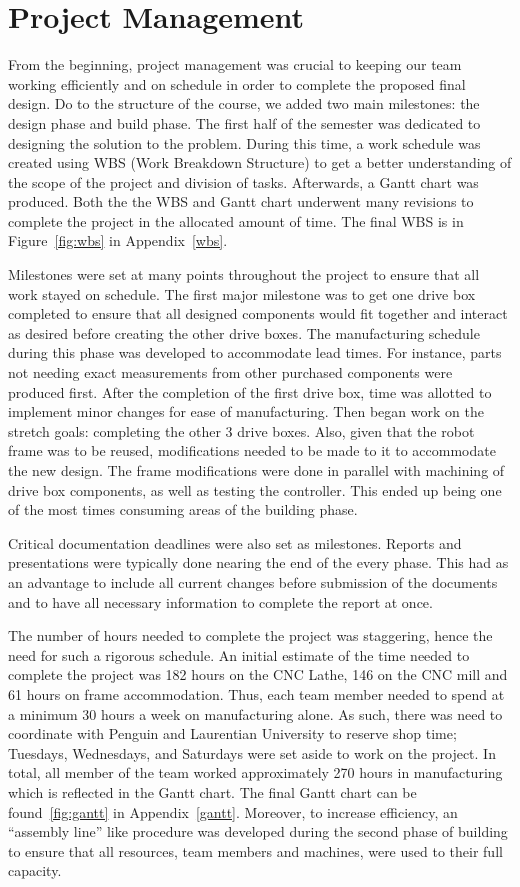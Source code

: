\section{Project Management}

From the beginning, project management was crucial to keeping our team working efficiently and on schedule in order to complete the proposed final design. Do to the structure of the course, we added two main milestones: the design phase and build phase. The first half of the semester was dedicated to designing the solution to the problem. During this time, a work schedule was created using WBS (Work Breakdown Structure) to get a better understanding of the scope of the project and division of tasks. Afterwards, a Gantt chart was produced. Both the the WBS and Gantt chart underwent many revisions to complete the project in the allocated amount of time. The final WBS is in Figure~\ref{fig:wbs} in Appendix~\ref{wbs}.

Milestones were set at many points throughout the project to ensure that all work stayed on schedule. The first major milestone was to get one drive box completed to ensure that all designed components would fit together and interact as desired before creating the other drive boxes. The manufacturing schedule during this phase was developed to accommodate lead times. For instance, parts not needing exact measurements from other purchased components were produced first. After the completion of the first drive box, time was allotted to implement minor changes for ease of manufacturing. Then began work on the stretch goals: completing the other 3 drive boxes. Also, given that the robot frame was to be reused, modifications needed to be made to it to accommodate the new design. The frame modifications were done in parallel with machining of drive box components, as well as testing the controller.  This ended up being one of the most times consuming areas of the building phase.

Critical documentation deadlines were also set as milestones. Reports and presentations were typically done nearing the end of the every phase. This had as an advantage to include all current changes before submission of the documents and to have all necessary information to complete the report at once. 

The number of hours needed to complete the project was staggering, hence the need for such a rigorous schedule. An initial estimate of the time needed to complete the project was 182 hours on the CNC Lathe, 146 on the CNC mill and 61 hours on frame accommodation. Thus, each team member needed to spend at a minimum 30 hours a week on manufacturing alone. As such, there was need to coordinate with Penguin and Laurentian University to reserve shop time; Tuesdays, Wednesdays, and Saturdays were set aside to work on the project. In total, all member of the team worked approximately 270 hours in manufacturing which is reflected in the Gantt chart. The final Gantt chart can be found~\ref{fig:gantt} in Appendix~\ref{gantt}. Moreover, to increase efficiency, an ``assembly line'' like procedure was developed during the second phase of building to ensure that all resources, team members and machines, were used to their full capacity.